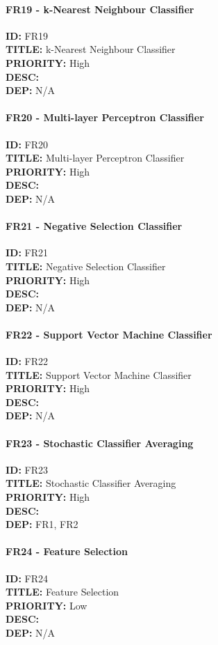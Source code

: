\paragraph*{FR19 - k-Nearest Neighbour Classifier}
\textbf{ID:} FR19 \\
\textbf{TITLE:} k-Nearest Neighbour Classifier \\
\textbf{PRIORITY:} High \\
\textbf{DESC:}   \\
\textbf{DEP:} N/A
\paragraph*{FR20 - Multi-layer Perceptron Classifier}
\textbf{ID:} FR20 \\
\textbf{TITLE:} Multi-layer Perceptron Classifier \\
\textbf{PRIORITY:} High \\
\textbf{DESC:}   \\
\textbf{DEP:} N/A
\paragraph*{FR21 - Negative Selection Classifier}
\textbf{ID:} FR21 \\
\textbf{TITLE:} Negative Selection Classifier \\
\textbf{PRIORITY:} High \\
\textbf{DESC:}   \\
\textbf{DEP:} N/A
\paragraph*{FR22 - Support Vector Machine Classifier}
\textbf{ID:} FR22 \\
\textbf{TITLE:} Support Vector Machine Classifier \\
\textbf{PRIORITY:} High \\
\textbf{DESC:}   \\
\textbf{DEP:} N/A
\paragraph*{FR23 - Stochastic Classifier Averaging}
\textbf{ID:} FR23 \\
\textbf{TITLE:} Stochastic Classifier Averaging \\
\textbf{PRIORITY:} High \\
\textbf{DESC:}   \\
\textbf{DEP:} FR1, FR2
\paragraph*{FR24 - Feature Selection}
\textbf{ID:} FR24 \\
\textbf{TITLE:} Feature Selection \\
\textbf{PRIORITY:} Low \\
\textbf{DESC:}   \\
\textbf{DEP:} N/A


